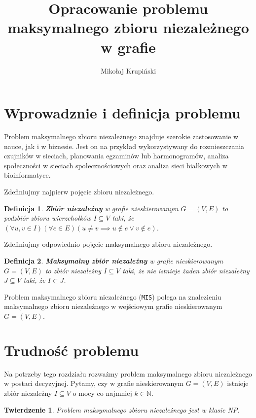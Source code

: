 \documentclass[12pt]{article}
\title{Opracowanie problemu maksymalnego zbioru niezależnego w grafie}
\author{Mikołaj Krupiński}
\newtheorem{definition}{Definicja}
\newtheorem{theorem}{Twierdzenie}
\begin{document}
\maketitle

\section{Wprowadznie i definicja problemu}

Problem maksymalnego zbioru niezależnego znajduje szerokie zastosowanie w nauce, jak i w biznesie. Jest on na przykład wykorzystywany do rozmieszczania czujników w sieciach, planowania egzaminów lub harmonogramów, analiza społeczności w sieciach społecznościowych oraz analiza sieci białkowych w bioinformatyce.

Zdefiniujmy najpierw pojęcie zbioru niezależnego.

\begin{definition}
    \textbf{Zbiór niezależny} w grafie nieskierowanym $G=(V,E)$ to podzbiór zbioru wierzchołków $I \subseteq V$ taki, że $(\forall u,v \in I)(\forall e \in E)(u \neq v \implies u \notin e \vee v \notin e)$.
\end{definition}

Zdefiniujmy odpowiednio pojęcie maksymalnego zbioru niezależnego.

\begin{definition}
    \textbf{Maksymalny zbiór niezależny} w grafie nieskierowanym $G=(V,E)$ to zbiór niezależny $I \subseteq V$ taki, że nie istnieje żaden zbiór niezależny $J \subseteq V$ taki, że $I \subset J$.
\end{definition}

Problem maksymalnego zbioru niezależnego (\texttt{MIS}) polega na znalezieniu maksymalnego zbioru niezależnego w wejściowym grafie nieskierowanym $G=(V,E)$.

\section{Trudność problemu}

Na potrzeby tego rozdziału rozważmy problem maksymalnego zbioru niezależnego w postaci decyzyjnej. Pytamy, czy w grafie nieskierowanym $G=(V,E)$ istnieje zbiór niezależny $I \subseteq V$ o mocy co najmniej $k \in \mathbb{N}$.

\begin{theorem}
    Problem maksymalnego zbioru niezależnego jest w klasie NP.
\end{theorem}
\end{document}
